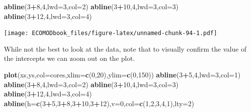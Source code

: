 \documentclass[
]{book}
\newenvironment{Shaded}{\begin{snugshade}}{\end{snugshade}}
\newcommand{\DataTypeTok}[1]{\textcolor[rgb]{0.13,0.29,0.53}{#1}}
\newcommand{\DecValTok}[1]{\textcolor[rgb]{0.00,0.00,0.81}{#1}}
\newcommand{\KeywordTok}[1]{\textcolor[rgb]{0.13,0.29,0.53}{\textbf{#1}}}
\newcommand{\NormalTok}[1]{#1}
\newcommand{\OperatorTok}[1]{\textcolor[rgb]{0.81,0.36,0.00}{\textbf{#1}}}
\begin{document}
\begin{Shaded}
\begin{Highlighting}[]
\KeywordTok{abline}\NormalTok{(}\DecValTok{3}\OperatorTok{+}\DecValTok{8}\NormalTok{,}\DecValTok{4}\NormalTok{,}\DataTypeTok{lwd=}\DecValTok{3}\NormalTok{,}\DataTypeTok{col=}\DecValTok{2}\NormalTok{)}
\KeywordTok{abline}\NormalTok{(}\DecValTok{3}\OperatorTok{+}\DecValTok{10}\NormalTok{,}\DecValTok{4}\NormalTok{,}\DataTypeTok{lwd=}\DecValTok{3}\NormalTok{,}\DataTypeTok{col=}\DecValTok{3}\NormalTok{)}
\KeywordTok{abline}\NormalTok{(}\DecValTok{3}\OperatorTok{+}\DecValTok{12}\NormalTok{,}\DecValTok{4}\NormalTok{,}\DataTypeTok{lwd=}\DecValTok{3}\NormalTok{,}\DataTypeTok{col=}\DecValTok{4}\NormalTok{)}
\end{Highlighting}
\end{Shaded}

\texttt{[image: ECOMODbook\_files/figure-latex/unnamed-chunk-94-1.pdf]}

While not the best to look at the data, note that to visually confirm the value of the intercepts we can zoom out on the plot.

\begin{Shaded}
\begin{Highlighting}[]
\KeywordTok{plot}\NormalTok{(xs,ys,}\DataTypeTok{col=}\NormalTok{cores,}\DataTypeTok{xlim=}\KeywordTok{c}\NormalTok{(}\DecValTok{0}\NormalTok{,}\DecValTok{20}\NormalTok{),}\DataTypeTok{ylim=}\KeywordTok{c}\NormalTok{(}\DecValTok{0}\NormalTok{,}\DecValTok{150}\NormalTok{))}
\KeywordTok{abline}\NormalTok{(}\DecValTok{3}\OperatorTok{+}\DecValTok{5}\NormalTok{,}\DecValTok{4}\NormalTok{,}\DataTypeTok{lwd=}\DecValTok{3}\NormalTok{,}\DataTypeTok{col=}\DecValTok{1}\NormalTok{)}
\KeywordTok{abline}\NormalTok{(}\DecValTok{3}\OperatorTok{+}\DecValTok{8}\NormalTok{,}\DecValTok{4}\NormalTok{,}\DataTypeTok{lwd=}\DecValTok{3}\NormalTok{,}\DataTypeTok{col=}\DecValTok{2}\NormalTok{)}
\KeywordTok{abline}\NormalTok{(}\DecValTok{3}\OperatorTok{+}\DecValTok{10}\NormalTok{,}\DecValTok{4}\NormalTok{,}\DataTypeTok{lwd=}\DecValTok{3}\NormalTok{,}\DataTypeTok{col=}\DecValTok{3}\NormalTok{)}
\KeywordTok{abline}\NormalTok{(}\DecValTok{3}\OperatorTok{+}\DecValTok{12}\NormalTok{,}\DecValTok{4}\NormalTok{,}\DataTypeTok{lwd=}\DecValTok{3}\NormalTok{,}\DataTypeTok{col=}\DecValTok{4}\NormalTok{)}
\KeywordTok{abline}\NormalTok{(}\DataTypeTok{h=}\KeywordTok{c}\NormalTok{(}\DecValTok{3}\OperatorTok{+}\DecValTok{5}\NormalTok{,}\DecValTok{3}\OperatorTok{+}\DecValTok{8}\NormalTok{,}\DecValTok{3}\OperatorTok{+}\DecValTok{10}\NormalTok{,}\DecValTok{3}\OperatorTok{+}\DecValTok{12}\NormalTok{),}\DataTypeTok{v=}\DecValTok{0}\NormalTok{,}\DataTypeTok{col=}\KeywordTok{c}\NormalTok{(}\DecValTok{1}\NormalTok{,}\DecValTok{2}\NormalTok{,}\DecValTok{3}\NormalTok{,}\DecValTok{4}\NormalTok{,}\DecValTok{1}\NormalTok{),}\DataTypeTok{lty=}\DecValTok{2}\NormalTok{)}
\end{Highlighting}
\end{Shaded}
\end{document}

